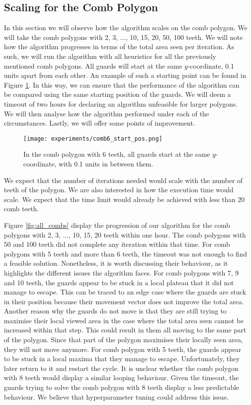 \subsection{Scaling for the Comb Polygon}
In this section we will observe how the algorithm scales on the comb polygon. We will take the comb polygons with 2, 3, ..., 10, 15, 20, 50, 100 teeth. We will note how the algorithm progresses in terms of the total area seen per iteration.
As such, we will run the algorithm with all heuristics for all the previously mentioned comb polygons. All guards will start at the same $y$-coordinate, 0.1 units apart from each other. An example of such a starting point can be found in Figure \ref{fig:comb6_start_pos}. In this way, we can ensure that the performance of the algorithm can be compared using the same starting position of the guards. We will deem a timeout of two hours for declaring an algorithm unfeasible for larger polygons. We will then analyse how the algorithm performed under each of the circumstances. Lastly, we will offer some points of improvement.

\begin{figure}[h!]
    \centering
    \texttt{[image: experiments/comb6\_start\_pos.png]}
    \caption{In the comb polygon with 6 teeth, all guards start at the same $y$-coordinate, with 0.1 units in between them.}
    \label{fig:comb6_start_pos}
\end{figure}

We expect that the number of iterations needed would scale with the number of teeth of the polygon. We are also interested in how the execution time would scale. We expect that the time limit would already be achieved with less than 20 comb teeth.

Figure \ref{fig:all_combs} display the progression of our algorithm for the comb polygons with 2, 3, ..., 10, 15, 20 teeth within one hour. The comb polygons with 50 and 100 teeth did not complete any iteration within that time.
For comb polygons with 5 teeth and more than 6 teeth, the timeout was not enough to find a feasible solution. Nonetheless, it is worth discussing their behaviour, as it highlights the different issues the algorithm faces. 
For comb polygons with 7, 9 and 10 teeth, the guards appear to be stuck in a local plateau that it did not manage to escape. This can be traced to an edge case where the guards are stuck in their position because their movement vector does not improve the total area. Another reason why the guards do not move is that they are still trying to maximise their local viewed area in the case where the total area seen cannot be increased within that step. This could result in them all moving to the same part of the polygon. Since that part of the polygon maximises their locally seen area, they will not move anymore.
For comb polygon with 5 teeth, the guards appear to be stuck in a local maxima that they manage to escape. Unfortunately, they later return to it and restart the cycle. It is unclear whether the comb polygon with 8 teeth would display a similar looping behaviour. Given the timeout, the guards trying to solve the comb polygon with 8 teeth display a less predictable behaviour. We believe that hyperparameter tuning could address this issue.

